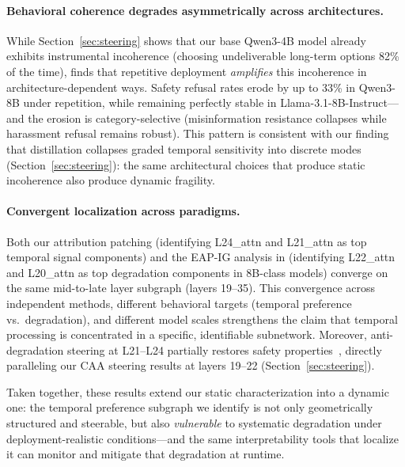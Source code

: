 \paragraph{Behavioral coherence degrades asymmetrically across architectures.}
While Section~\ref{sec:steering} shows that our base Qwen3-4B model already exhibits instrumental incoherence (choosing undeliverable long-term options 82\% of the time), \citet{molofsky2026patience} finds that repetitive deployment \emph{amplifies} this incoherence in architecture-dependent ways.
Safety refusal rates erode by up to 33\% in Qwen3-8B under repetition, while remaining perfectly stable in Llama-3.1-8B-Instruct---and the erosion is category-selective (misinformation resistance collapses while harassment refusal remains robust).
This pattern is consistent with our finding that distillation collapses graded temporal sensitivity into discrete modes (Section~\ref{sec:steering}): the same architectural choices that produce static incoherence also produce dynamic fragility.

\paragraph{Convergent localization across paradigms.}
Both our attribution patching (identifying L24\_attn and L21\_attn as top temporal signal components) and the EAP-IG analysis in \citet{molofsky2026patience} (identifying L22\_attn and L20\_attn as top degradation components in 8B-class models) converge on the same mid-to-late layer subgraph (layers 19--35).
This convergence across independent methods, different behavioral targets (temporal preference vs.\ degradation), and different model scales strengthens the claim that temporal processing is concentrated in a specific, identifiable subnetwork.
Moreover, anti-degradation steering at L21--L24 partially restores safety properties~\citep{molofsky2026patience}, directly paralleling our CAA steering results at layers 19--22 (Section~\ref{sec:steering}).

Taken together, these results extend our static characterization into a dynamic one: the temporal preference subgraph we identify is not only geometrically structured and steerable, but also \emph{vulnerable} to systematic degradation under deployment-realistic conditions---and the same interpretability tools that localize it can monitor and mitigate that degradation at runtime.
